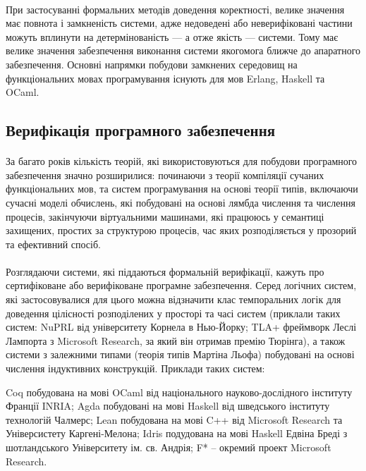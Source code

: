 \documentclass[11pt,oneside]{article}
\begin{document}
   \paragraph{}
   При застосуванні формальних методів доведення коректності, велике значення має повнота і замкненість системи,
   адже недоведені або неверифіковані частини можуть вплинути на детермінованість — а отже якість — системи.
   Тому має велике значення забезпечення виконання системи якогомога ближче до апаратного забезпечення.
   Основні напрямки побудови замкнених середовищ на функціональних мовах програмування
   існують для мов Erlang, Haskell та OCaml.

\newpage
\subsection{Верифікація програмного забезпечення}

   \paragraph{}
   За багато років кількість теорій, які використовуються для побудови програмного забезпечення значно розширилися:
   починаючи з теорії компіляції сучаних функціональних мов, та систем програмування на основі теорії типів,
   включаючи сучасні моделі обчислень, які побудовані на основі лямбда числення та числення процесів, закінчуючи віртуальними
   машинами, які працююсь у семантиці захищених, простих за структурою процесів, час яких розподіляється
   у прозорий та ефективний спосіб.

   \paragraph{}
   Розглядаючи системи, які піддаються формальній верифікації, кажуть про
   сертифіковане або верифіковане програмне забезпечення. Серед логічних систем, які
   застосовувалися для цього можна відзначити клас темпоральних логік для доведення
   цілісності розподілених у просторі та часі систем (приклали таких систем: NuPRL від університету Корнела в Нью-Йорку;
   TLA+ фреймворк Леслі Лампорта з Microsoft Research, за який він отримав премію Тюрінга), а також системи з залежними
   типами (теорія типів Мартіна Льофа) побудовані на основі числення індуктивних конструкцій. Приклади таких систем:

   Coq побудована на мові OCaml від національного науково-дослідного інституту Франції INRIA;
   Agda побудовані на мові Haskell від шведського інституту технологій Чалмерс;
   Lean побудована на мові C++ від Microsoft Research та Універсистету Каргені-Мелона;
   Idris подудована на мові Haskell Едвіна Бреді з шотландського Університету ім. св. Андрія;
   F* -- окремий проект Microsoft Research.
\end{document}
